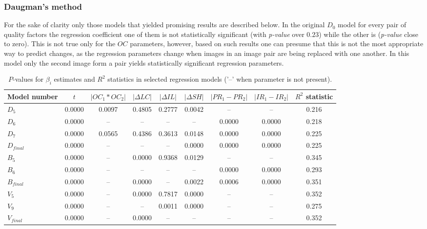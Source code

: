 \documentclass{article}
\begin{document}
\subsubsection{Daugman's method}
For the sake of clarity only those models that yielded promising results are described below. In the original $D_0$ model for every pair of quality factors the regression coefficient one of them is not statistically significant (with \emph{p-value} over $0.23$) while the other is (\emph{p-value} close to zero). This is not true only for the $OC$ parameters, however, based on such results one can presume that this is not the most appropriate way to predict changes, as the regression parameters change when images in an image pair are being replaced with one another. In this model only the second image form a pair yields statistically significant regression parameters.

\begin{table*}
\scriptsize
\caption{$P$-values for $\beta_{i}$ estimates and $R^2$ statistics in selected regression models ('--' when parameter is not present).}
\label{daugman_results}
\vskip0.2cm
\centering
\begin{tabular}{|p{}|c|c|c|c|c|c|c|c|}
\hline
\textbf{Model number} & $t$ & $|OC_{1} * OC_{2}|$ & $|\Delta LC|$ & $|\Delta IL|$ & $|\Delta SH|$ & $|PR_{1} - PR_{2}|$ & $|IR_{1} - IR_{2}|$ & $R^2$ statistic\\
\hline
$D_{5}$ & 0.0000 & 0.0097 & 0.4805 & 0.2777 & 0.0042 & -- & -- & 0.216\\
\hline
$D_{6}$ & 0.0000 & -- & -- & -- & -- & 0.0000 & 0.0000& 0.218\\
\hline
$D_{7}$ & 0.0000 & 0.0565 & 0.4386 & 0.3613 & 0.0148 & 0.0000 & 0.0000 & 0.225\\
\hline
$D_{final}$ & 0.0000 & -- & -- & -- & 0.0000 & 0.0000 & 0.0000 & 0.225\\
\hline
$B_{5}$ & 0.0000 & -- & 0.0000 & 0.9368 & 0.0129 & -- & -- & 0.345\\
\hline
$B_{6}$ & 0.0000 & -- & -- & -- & -- & 0.0000 & 0.0000 & 0.293\\
\hline
$B_{final}$ & 0.0000 & -- & 0.0000 & -- & 0.0022 & 0.0006 & 0.0000 & 0.351\\
\hline
$V_{5}$ & 0.0000 & -- & 0.0000 & 0.7817 & 0.0000 & -- & -- & 0.352\\
\hline
$V_{9}$ & 0.0000 & -- & -- & 0.0011 & 0.0000 & -- & -- & 0.275\\
\hline
$V_{final}$ & 0.0000 & -- & 0.0000 & -- & -- & -- & -- & 0.352\\
\hline
\end{tabular}
\end{table*}
\end{document}
